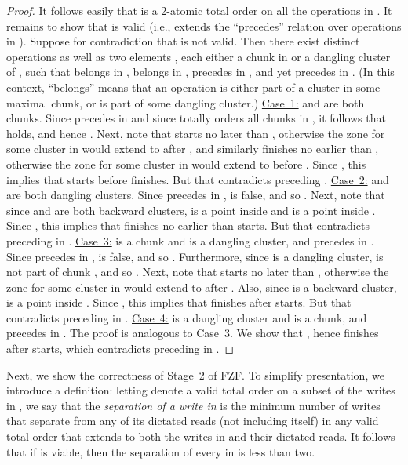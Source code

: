 \begin{lemma}
\begin{proof}
It follows easily that  is a 2-atomic total order on all the operations in .
It remains to show that  is valid (i.e., extends the ``precedes'' relation over operations in ).
Suppose for contradiction that  is not valid.
Then there exist distinct operations  as well as two elements ,
each either a chunk in  or a dangling cluster of ,
such that  belongs in ,  belongs in ,
 precedes  in , and yet  precedes  in .
(In this context, ``belongs'' means that an operation is either part of a cluster in some maximal chunk,
or is part of some dangling cluster.)
\newline\underline{Case~1:}  and  are both chunks.
Since  precedes  in  and since  totally orders all chunks in ,
it follows that  holds, and hence .
Next, note that  starts no later than , otherwise the zone for some cluster in  would extend to after ,
and similarly  finishes no earlier than , otherwise the zone for some cluster in  would extend to before .
Since , this implies that  starts before  finishes.
But that contradicts  preceding .
\newline\underline{Case~2:}  and  are both dangling clusters.
Since  precedes  in ,  is false, and so .
Next, note that since  and  are both backward clusters,
 is a point inside  and  is a point inside .
Since , this implies that  finishes no earlier than  starts.
But that contradicts  preceding  in .
\newline\underline{Case~3:}  is a chunk and  is a dangling cluster, and  precedes  in .
Since  precedes  in ,  is false, and so .
Furthermore, since  is a dangling cluster,  is not part of chunk , and so .
Next, note that  starts no later than , otherwise the zone for some cluster in  would extend to after .
Also, since  is a backward cluster,  is a point inside .
Since , this implies that  finishes after  starts.
But that contradicts  preceding  in .
\newline\underline{Case~4:}  is a dangling cluster and  is a chunk, and  precedes  in .
The proof is analogous to Case~3.
We show that , hence  finishes after  starts, which contradicts  preceding  in .
\end{proof}
\end{lemma}

\medskip
Next, we show the correctness of Stage~2 of FZF.
To simplify presentation, we introduce a definition:
letting  denote a valid total order on a subset  of the writes in , we say that 
the \emph{separation of a write  in } is the minimum number of writes
that separate  from any of its dictated reads (not including  itself) in any valid total order  that
extends  to both the writes in  and their dictated reads.
It follows that if  is viable, then the separation of every  in 
is less than two.

